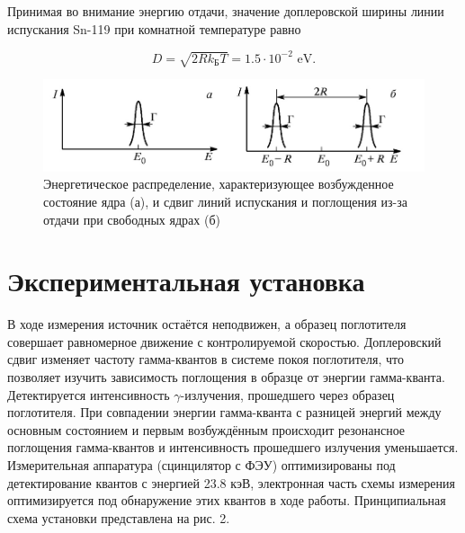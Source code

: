 \documentclass[a4paper,12pt]{article} %
\begin{document}
\noindent Принимая во внимание энергию отдачи, значение доплеровской ширины линии испускания Sn-119 при комнатной температуре равно

$$
D = \sqrt{2Rk_{\text{Б}}T} = 1.5 \cdot 10^{-2} \text{ eV}.
$$

\begin{figure}[h!]
\begin{center}
\includegraphics[scale=0.55]{1}
\caption{Энергетическое распределение, характеризующее возбужденное состояние ядра (а), и сдвиг линий испускания и поглощения из-за отдачи при свободных ядрах (б)}
\end{center}
\end{figure}


\section{Экспериментальная установка}
\noindent В ходе измерения источник остаётся неподвижен, а образец поглотителя совершает равномерное движение с контролируемой скоростью. Доплеровский сдвиг изменяет частоту гамма-квантов в системе покоя поглотителя, что позволяет изучить зависимость поглощения в образце от энергии гамма-кванта. Детектируется интенсивность $\gamma$-излучения, прошедшего через образец поглотителя. При совпадении энергии гамма-кванта с разницей энергий между основным состоянием и первым возбуждённым происходит резонансное поглощения гамма-квантов и интенсивность прошедшего излучения уменьшается. Измерительная аппаратура (сцинцилятор с ФЭУ) оптимизированы под детектирование квантов с энергией 23.8 кэВ, электронная часть схемы измерения оптимизируется под обнаружение этих квантов в ходе работы. Принципиальная схема установки представлена на рис. 2.
\end{document}
